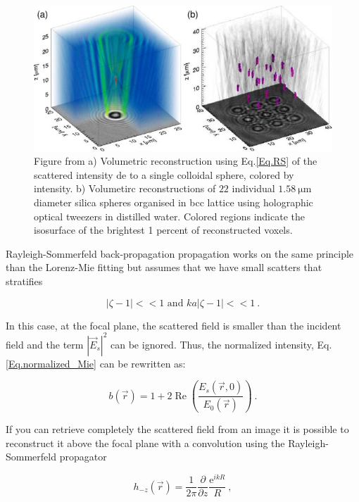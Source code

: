 \begin{figure}[h!]
	\centering
	\includegraphics[scale=2]{02_body/chapter2/images/sommerfel_demo.jpg}
	\caption{Figure from \cite{cheong_strategies_2010} a) Volumetric reconstruction using Eq.\ref{Eq.RS} of the scattered intensity de to a single colloidal sphere, colored by intensity. b) Volumetirc reconstructions of $22$ individual $1.58 ~ \mathrm{\mu m}$ diameter silica spheres organised in bcc lattice using holographic optical tweezers in distilled water. Colored regions indicate the isosurface of the brightest 1 percent of reconstructed voxels.}
	\label{fig.sommerfeld}
\end{figure}



Rayleigh-Sommerfeld back-propagation \cite{wilson_3d_2012} propagation works on the same principle than the Lorenz-Mie fitting but assumes that we have small scatters that stratifies

\begin{equation}
	|\zeta - 1| << 1 \text{ and } ka|\zeta - 1| << 1 ~.
\end{equation}

In this case, at the focal plane, the scattered field is smaller than the incident field and the term $|\vec{E}_s|^2$ can be ignored. Thus, the normalized intensity, Eq.\ref{Eq.normalized_Mie} can be rewritten as:

\begin{equation}
	b(\vec{r})= 1 + 2\operatorname{Re}\left( \frac{E_s(\vec{r},0)}{E_0(\vec{r})} \right) ~.
\end{equation}

If you can retrieve completely the scattered field from an image it is possible to reconstruct it above the focal plane with a convolution using the Rayleigh-Sommerfeld propagator \cite{goodman_introduction_2005}

\begin{equation}
	h_{-z}(\vec{r}) = \frac{1}{2 \pi} \frac{\partial}{\partial z} \frac{\mathrm{e}^{ikR}}{R} ~,
\end{equation}

